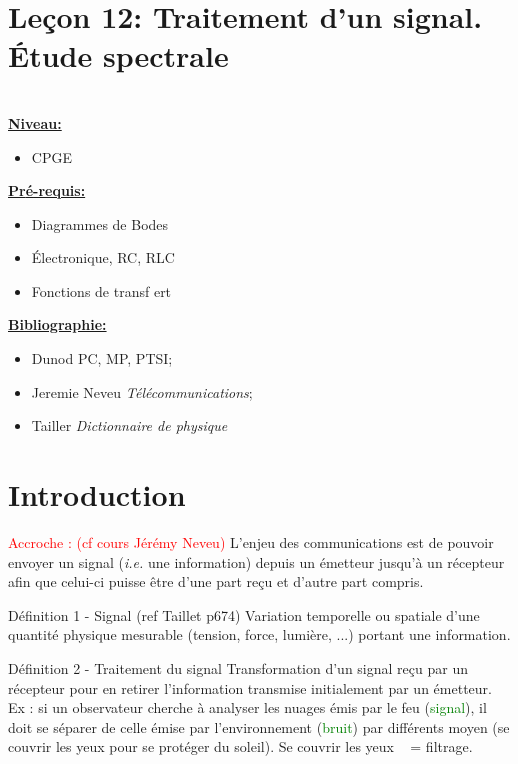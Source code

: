 \documentclass[french, a4paper, 10pt, twocolumn, landscape]{article}
\begin{document}
\section*{Leçon 12: Traitement d'un signal. Étude spectrale}

\hrulefill\\

\noindent\underline{\textbf{Niveau:}}
\begin{itemize}
  \item CPGE 
\end{itemize}
\underline{\textbf{Pr{\'e}-requis: }}

\begin{itemize}  
\item Diagrammes de Bodes
\item Électronique, RC, RLC
\item Fonctions de transf ert
\end{itemize}
\underline{\textbf{Bibliographie:}}

\begin{itemize}
  \item Dunod PC, MP, PTSI;
  \item Jeremie Neveu \textit{Télécommunications};
  \item Tailler \textit{Dictionnaire de physique}
\end{itemize}
\hrulefill


\section*{Introduction}

\textcolor{red}{Accroche : (cf cours Jérémy Neveu) }L'enjeu des communications est de pouvoir envoyer un signal (\textit{i.e.} une information) depuis un émetteur jusqu'à un récepteur afin que celui-ci puisse être d'une part reçu et d'autre part compris.

\begin{definition}{Définition 1 - Signal}
  (ref Taillet p674) Variation temporelle ou spatiale d'une quantité physique mesurable (tension, force, lumière, ...) portant une information.
\end{definition}

\begin{definition}{Définition 2 - Traitement du signal}
  Transformation d'un signal reçu par un récepteur pour en retirer l'information transmise initialement par un émetteur. Ex : si un observateur cherche à analyser les nuages émis par le feu (\textcolor{green}{signal}), il doit se séparer de celle émise par l'environnement (\textcolor{green}{bruit}) par différents moyen (se couvrir les yeux pour se protéger du soleil). \og Se couvrir les yeux \fg~ = filtrage.
\end{definition}
\end{document}
